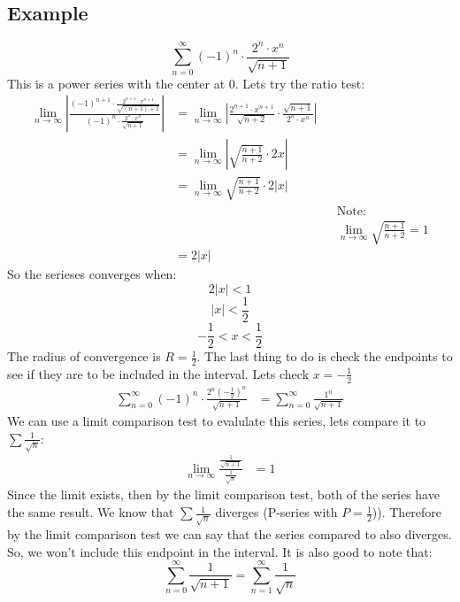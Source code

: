 \documentclass{article}
\begin{document}
    \subsection{Example}
        \[\sum_{n=0}^{\infty} (-1)^n \cdot \frac{2^n \cdot x^n}{\sqrt{n+1}}\]
        This is a power series with the center at \(0\).
        Lets try the ratio test:
        \begin{align*}
            \lim_{n \to \infty} \left| \frac{(-1)^{n+1} \cdot \frac{2^{n+1} \cdot x^{n+1}}{\sqrt{(n+1)+1}}}{(-1)^n \cdot \frac{2^n \cdot x^n}{\sqrt{n+1}}} \right|
            &= \lim_{n \to \infty} \left| \frac{2^{n+1} \cdot x^{n+1}}{\sqrt{n+2}} \cdot \frac{\sqrt{n+1}}{2^n \cdot x^n} \right| \\
            &= \lim_{n \to \infty} \left| \sqrt{\frac{n+1}{n+2}} \cdot 2x \right| \\
            &= \lim_{n \to \infty}  \sqrt{\frac{n+1}{n+2}} \cdot 2 |x| \\
            && &\text{Note:} \\
            && &\lim_{n \to \infty}  \sqrt{\frac{n+1}{n+2}} = 1 \\
            &=2|x|
        \end{align*}
        So the serieses converges when:
        \[2|x| < 1\]
        \[|x| < \frac{1}{2}\]
        \[- \frac{1}{2} < x < \frac{1}{2}\]
        The radius of convergence is \(R = \frac{1}{2}\).
        The last thing to do is check the endpoints to see if they are to be included in the interval.
        Lets check \(x = - \frac{1}{2}\)
        \begin{align*}
            \sum_{n=0}^{\infty} (-1)^n \cdot \frac{2^n(- \frac{1}{2})^n}{\sqrt{n+1}}
            &= \sum_{n=0}^{\infty} \frac{1^n}{\sqrt{n+1}}
        \end{align*}
        We can use a limit comparison test to evalulate this series, lets compare it to \(\sum \frac{1}{\sqrt{n}}\):
        \begin{align*}
            \lim_{n \to \infty} \frac{\frac{1}{\sqrt{n+1}}}{\frac{1}{\sqrt{n}}}
            &= 1
        \end{align*}
        Since the limit exists, then by the limit comparison test, both of the series have the same result.
        We know that \(\sum \frac{1}{\sqrt{n}}\) diverges (P-series with \(P = \frac{1}{2}\))).
        Therefore by the limit comparison test we can say that the series compared to also diverges.
        So, we won't include this endpoint in the interval.
        It is also good to note that:
        \[\sum_{n=0}^{\infty} \frac{1}{\sqrt{n+1}} = \sum_{n = 1}^{\infty} \frac{1}{\sqrt{n}}\]
\end{document}

